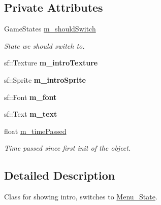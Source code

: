 \subsection*{Private Attributes}
\begin{DoxyCompactItemize}
\item 
Game\+States \hyperlink{classIntro__State_a8c8063e0c23f3601e1471d4197bad9a6}{m\+\_\+should\+Switch}\hypertarget{classIntro__State_a8c8063e0c23f3601e1471d4197bad9a6}{}\label{classIntro__State_a8c8063e0c23f3601e1471d4197bad9a6}

\begin{DoxyCompactList}\small\item\em State we should switch to. \end{DoxyCompactList}\item 
sf\+::\+Texture {\bfseries m\+\_\+intro\+Texture}\hypertarget{classIntro__State_a45c9554c2c34aa36cd1492dbe499850a}{}\label{classIntro__State_a45c9554c2c34aa36cd1492dbe499850a}

\item 
sf\+::\+Sprite {\bfseries m\+\_\+intro\+Sprite}\hypertarget{classIntro__State_af58027643e0637f5252ec99bc5610143}{}\label{classIntro__State_af58027643e0637f5252ec99bc5610143}

\item 
sf\+::\+Font {\bfseries m\+\_\+font}\hypertarget{classIntro__State_ad67c3e07107485f1c1190d8005e22f93}{}\label{classIntro__State_ad67c3e07107485f1c1190d8005e22f93}

\item 
sf\+::\+Text {\bfseries m\+\_\+text}\hypertarget{classIntro__State_a73491e0d8bd1677568f6cfa92eb06ca2}{}\label{classIntro__State_a73491e0d8bd1677568f6cfa92eb06ca2}

\item 
float \hyperlink{classIntro__State_a86f099460aac2b8945c485bc824bf0ec}{m\+\_\+time\+Passed}\hypertarget{classIntro__State_a86f099460aac2b8945c485bc824bf0ec}{}\label{classIntro__State_a86f099460aac2b8945c485bc824bf0ec}

\begin{DoxyCompactList}\small\item\em Time passed since first init of the object. \end{DoxyCompactList}\end{DoxyCompactItemize}


\subsection{Detailed Description}
Class for showing intro, switches to \hyperlink{classMenu__State}{Menu\+\_\+\+State}. 


